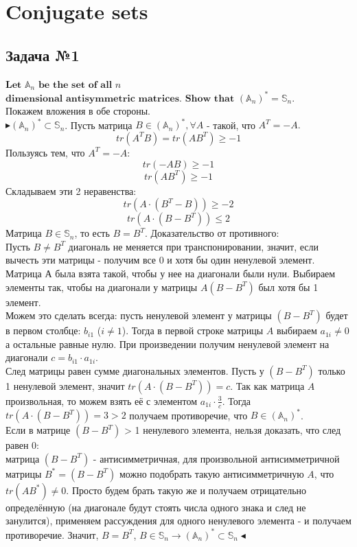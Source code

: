 \documentclass[12pt,letterpaper]{article}
\begin{document}
\newpage
\section{Conjugate sets}
\subsection*{Задача №1}
$\textbf{Let}$ $\mathbb{A}_n$ $\textbf{be the set of all}$ $n$ $\textbf{dimensional antisymmetric matrices. Show that}$ $\left( \mathbb{A}_n\right)^* = \mathbb{S}_n$. \\

Покажем вложения в обе стороны. \\
$\blacktriangleright \left( \mathbb{A}_n\right)^* \subset \mathbb{S}_n  $. Пусть матрица $ B \in \left( \mathbb{A}_n\right)^*, \forall A $ - такой, что $ A^T = -A. $ 
$$ tr \left( A^T B \right) = tr \left( A B^T \right) \geq -1  $$
Пользуясь тем, что $ A^T = -A $:
$$ tr \left( -AB \right) \geq -1 $$
$$ tr \left( A B^T \right) \geq -1$$
Складываем эти 2 неравенства:
$$ tr \left( A \cdot (B^T-B) \right) \geq -2 $$
$$
tr \left( A \cdot (B- B^T) \right) \leq 2
$$
Матрица $ B \in  \mathbb{S}_n $, то есть $ B = B^T $. Доказательство от противного: \\
Пусть $ B \neq B^T $ диагональ не меняется при транспонировании, значит, если вычесть эти матрицы - получим все 0 и хотя бы один ненулевой элемент. Матрица А была взята такой, чтобы у нее на диагонали были нули. Выбираем элементы так, чтобы на диагонали у матрицы $ A (B-B^T) $ был хотя бы 1 элемент.\\ 
Можем это сделать всегда: пусть ненулевой элемент у матрицы $ (B-B^T) $ будет в первом столбце: $ b_{i1} $ ($i\neq1$). Тогда в первой строке матрицы $A$ выбираем $ a_{1i} \neq 0 $ а остальные равные нулю. При произведении получим ненулевой элемент на диагонали $ c = b_{i1} \cdot a_{1i}  $.\\
След матрицы равен сумме диагональных  элементов. Пусть у $ (B-B^T) $ только 1 ненулевой элемент, значит  $ tr \left( A \cdot (B- B^T) \right) = c$. Так как матрица $ A $ произвольная, то можем взять её с элементом  $a_{1i} \cdot \frac{3}{c} $. Тогда $ tr \left( A \cdot (B- B^T) \right) = 3 > 2 $ получаем противоречие, что $ B \in \left( \mathbb{A}_n\right)^* $.\\ 

Если в матрице $ (B-B^T) $ > 1 ненулевого элемента, нельзя доказать, что след равен 0: \\
матрица $ (B-B^T) $ - антисимметричная, для произвольной антисимметричной матрицы $ B^* =  (B-B^T) $ можно подобрать такую антисимметричную $ A $, что $ tr (A B^*) \neq 0$. Просто будем брать такую же и получаем отрицательно определённую (на диагонале будут стоять числа одного знака и след не занулится), применяем рассуждения для одного ненулевого элемента - и получаем противоречие. Значит, $ B = B^T $, $ B \in \mathbb{S}_n \rightarrow \left( \mathbb{A}_n\right)^* \subset \mathbb{S}_n \blacktriangleleft$\\
\end{document}
